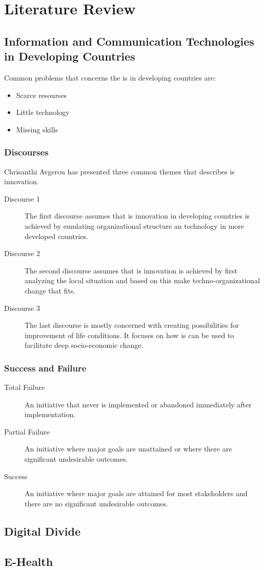 \chapter{Literature Review}

\section{Information and Communication Technologies in Developing Countries}

Common problems that concerns the \gls{is} in developing countries are:
\begin{itemize}
\item Scarce resourses
\item Little technology
\item Missing skills
\end{itemize}

\subsection{Discourses}
\label{subsec:discourses}
Chrisanthi Avgerou has presented three common themes that describes \gls{is} innovation. 
\begin{description}
\item[Discourse 1]
	The first discourse assumes that \gls{is} innovation in developing countries is achieved by emulating organizational structure an technology in more developed countries. 
\item[Discourse 2]
	The second discourse assumes that \gls{is} innovation is achieved by first analyzing the local situation and based on this make techno-organizational change that fits.
\item[Discourse 3]
	The last discourse is mostly concerned with creating possibilities for improvement of life conditions. It focuses on how \gls{is} can be used to facilitate deep socio-economic change.
\end{description}

\cite{ca:isdc}

\subsection{Success and Failure}
\label{successandfailure}
\begin{description}
\item[Total Failure] An initiative that never is implemented or abandoned immediately after implementation.
\item[Partial Failure] An initiative where major goals are unattained or where there are significant undesirable outcomes.
\item[Success] An initiative where major goals are attained for most stakeholders and there are no significant undesirable outcomes.
\end{description}



\cite{rh:isdc}


\section{Digital Divide}

\section{E-Health}



\cite{ehealth:blaya}
